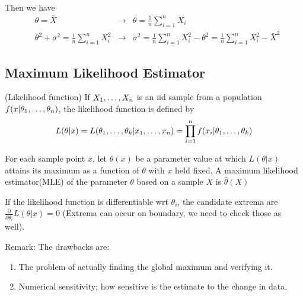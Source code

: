 \documentclass[12pt]{article}
\begin{document}
Then we have \begin{align*}
  &\theta = \bar{X} &\rightarrow &\theta = \frac{1}{n}\sum^n_{i=1}X_i  \\
  &\theta^2 + \sigma^2 =  \frac{1}{n} \sum^n_{i=1}X_i^2 
  &\rightarrow &\sigma^2 = \frac{1}{n} \sum^n_{i=1}X_i^2 - \theta^2  = \frac{1}{n} \sum^n_{i=1}X_i^2 - \bar{X}^2
\end{align*}

\subsection{Maximum Likelihood Estimator}
\begin{definition}(Likelihood function)
	If $\varvec{X}$ is an iid sample from a population $f(x|\varvec{\theta})$, the likelihood function is defined by $$
	 L(\theta|x) = L(\varvec[k]{\theta} | \varvec{x}) = \prod^n_{i=1} f(x_i | \varvec[k]{\theta})
	$$
\end{definition}

\begin{definition}
	For each sample point $x$, let $\hat{\theta}(x)$ be a parameter value at which $L(\theta| x)$ attains its maximum as a function of $\theta$ with $x$ held fixed. A maximum likelihood estimator(MLE) of the parameter $\theta$ based on a sample $X$ is $\hat{\theta}(X)$
\end{definition}

If the likelihood function is differentiable wrt $\theta_i$, the candidate extrema are $\frac{\partial}{\partial \theta_i}L(\theta |x) = 0$ (Extrema can occur on boundary, we need to check those as well).

Remark: The drawbacks are: \begin{enumerate}
	\item The problem of actually finding the global maximum and verifying it.
	\item Numerical sensitivity; how sensitive is the estimate to the change in data.
\end{enumerate}
\end{document}

